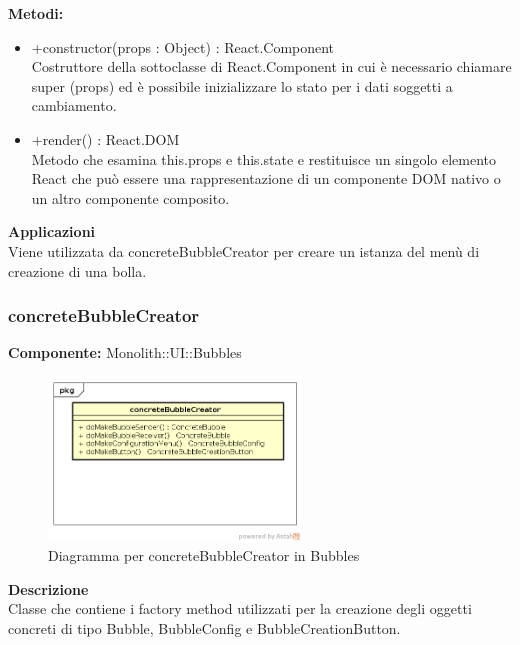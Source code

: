 \textbf{Metodi:} \begin{itemize}\item +constructor(props : Object) : React.Component \\Costruttore della sottoclasse di React.Component in cui è necessario chiamare super (props) ed è possibile inizializzare lo stato per i dati soggetti a cambiamento. 

\item +render() : React.DOM \\Metodo che esamina this.props e this.state e restituisce un singolo elemento React che può essere una rappresentazione di un componente DOM nativo o un altro componente composito.\end{itemize} 


\textbf{Applicazioni}\\
Viene utilizzata da concreteBubbleCreator per creare un istanza del menù di creazione di una bolla. 


\clearpage

\subsubsection{concreteBubbleCreator}
\textbf{Componente:}  Monolith::UI::Bubbles\\
   \FloatBarrier
   \begin{figure}[ht]
   \centering
   \includegraphics[width=0.6\textwidth]{img/single-concreteBubbleCreator}
   \caption{{Diagramma per concreteBubbleCreator in Bubbles}}
\end{figure}
\FloatBarrier
\textbf{Descrizione}\\
Classe che contiene i factory method utilizzati per la creazione degli oggetti concreti di tipo Bubble, BubbleConfig e BubbleCreationButton.

